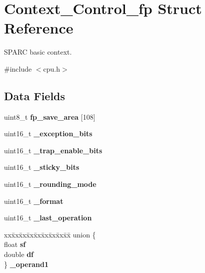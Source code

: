 \hypertarget{structContext__Control__fp}{}\section{Context\+\_\+\+Control\+\_\+fp Struct Reference}
\label{structContext__Control__fp}


S\+P\+A\+RC basic context.  




{\ttfamily \#include $<$cpu.\+h$>$}

\subsection*{Data Fields}
\begin{DoxyCompactItemize}
\item 
\mbox{\label{structContext__Control__fp_aa5fe6e6d7abb0dcec89300cbcc2a8a68}} 
uint8\+\_\+t {\bfseries fp\+\_\+save\+\_\+area} \mbox{[}108\mbox{]}
\item 
\mbox{\label{structContext__Control__fp_ae861c4b2055d75aa156eb036fa2b0006}} 
uint16\+\_\+t {\bfseries \+\_\+exception\+\_\+bits}
\item 
\mbox{\label{structContext__Control__fp_a05040c1bd2e402a2c524942aafcfda96}} 
uint16\+\_\+t {\bfseries \+\_\+trap\+\_\+enable\+\_\+bits}
\item 
\mbox{\label{structContext__Control__fp_a37833a1c769b8a5b2c62a560ec11f21a}} 
uint16\+\_\+t {\bfseries \+\_\+sticky\+\_\+bits}
\item 
\mbox{\label{structContext__Control__fp_a508f92aa34dc256cfa9eb41cbe27efb0}} 
uint16\+\_\+t {\bfseries \+\_\+rounding\+\_\+mode}
\item 
\mbox{\label{structContext__Control__fp_a1c60dca4aa0aa8b8899d339aa7a82a1f}} 
uint16\+\_\+t {\bfseries \+\_\+format}
\item 
\mbox{\label{structContext__Control__fp_a1174a1c2be1db124344c02c119f634a4}} 
uint16\+\_\+t {\bfseries \+\_\+last\+\_\+operation}
\item 
\mbox{\label{structContext__Control__fp_af879e4524fcdec81b6c8bbb82947abef}} 
\begin{tabbing}
xx\=xx\=xx\=xx\=xx\=xx\=xx\=xx\=xx\=\kill
union \{\\
\>float {\bfseries sf}\\
\>double {\bfseries df}\\
\} {\bfseries \_operand1}\\


\end{tabbing}
\end{DoxyCompactItemize}
